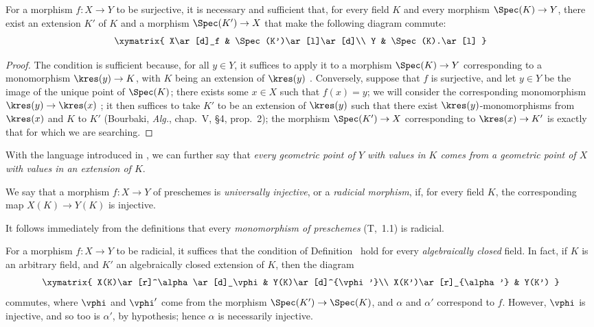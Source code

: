 \begin{proposition}[3.5.3]
\label{I.3.5.3}
For a morphism $f:X\to Y$ to be surjective, it is necessary and sufficient that, for every field $K$ and every morphism $\Spec(K)\to Y$, there exist an extension $K'$ of $K$ and a morphism $\Spec(K')\to X$ that make the following diagram commute:
\[
  \xymatrix{
    X\ar[d]_f &
    \Spec(K')\ar[l]\ar[d]\\
    Y &
    \Spec(K).\ar[l]
  }
\]
\end{proposition}

\begin{proof}
The condition is sufficient because, for all $y\in Y$, it suffices to apply it to a morphism $\Spec(K)\to Y$ corresponding to a monomorphism $\kres(y)\to K$, with $K$ being an extension of $\kres(y)$ .
Conversely, suppose that $f$ is surjective, and let $y\in Y$ be the image of the unique point of $\Spec(K)$; there exists some $x\in X$ such that $f(x)=y$; we will consider the corresponding monomorphism $\kres(y)\to\kres(x)$ ; it then suffices to take $K'$ to be an extension of $\kres(y)$ such that there exist $\kres(y)$-monomorphisms from $\kres(x)$ and $K$ to $K'$ (Bourbaki, \emph{Alg.}, chap.~V, §4, prop.~2); the morphism $\Spec(K')\to X$ corresponding to $\kres(x)\to K'$ is exactly that for which we are searching.
\end{proof}

With the language introduced in , we can further say that \emph{every geometric point of $Y$ with values in $K$ comes from a geometric point of $X$ with values in an extension of $K$}.

\begin{definition}[3.5.4]
\label{I.3.5.4}
We say that a morphism $f:X\to Y$ of preschemes is \emph{universally injective}, or a \emph{radicial morphism}, if, for every field $K$, the corresponding map $X(K)\to Y(K)$ is injective.
\end{definition}

It follows immediately from the definitions that every \emph{monomorphism of preschemes} (T,~1.1) is radicial.

\begin{env}[3.5.5]
\label{I.3.5.5}
For a morphism $f:X\to Y$ to be radicial, it suffices that the condition of Definition~ hold for every \emph{algebraically closed} field.
In fact, if $K$ is an arbitrary field, and $K'$ an algebraically closed extension of $K$, then the diagram
\[
  \xymatrix{
    X(K)\ar[r]^\alpha\ar[d]_\vphi &
    Y(K)\ar[d]^{\vphi'}\\
    X(K')\ar[r]_{\alpha'} &
    Y(K')
  }
\]
commutes, where $\vphi$ and $\vphi'$ come from the morphism $\Spec(K')\to\Spec(K)$, and $\alpha$ and $\alpha'$ correspond to $f$.
However, $\vphi$ is injective, and so too is $\alpha'$, by hypothesis; hence $\alpha$ is necessarily injective.
\end{env}

